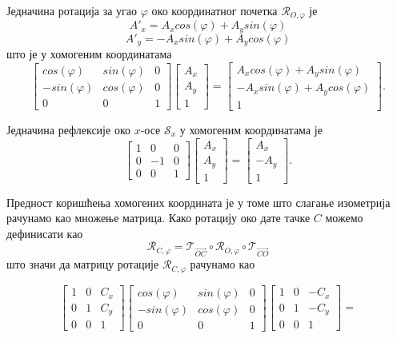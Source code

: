 \documentclass[12pt]{report}
\begin{document}
Једначина ротација за угао $\varphi$ око координатног почетка $\mathcal{R}_{O,\varphi}$ је $$A'_x = A_x  cos(\varphi) +  A_y  sin(\varphi)$$ 
$$A'_y = -A_x  sin(\varphi) + A_y  cos(\varphi)$$
што је у хомогеним координатама
\[\begin{bmatrix}cos(\varphi) & sin(\varphi) & 0\\ -sin(\varphi) & cos(\varphi)&0 \\ 0 & 0 & 1\end{bmatrix} \begin{bmatrix}A_x\\ A_y\\1\end{bmatrix} = 
\begin{bmatrix}A_x  cos(\varphi) +  A_y  sin(\varphi)\\ -A_x  sin(\varphi) + A_y  cos(\varphi)\\1\end{bmatrix}.\]

Једначина рефлексије око $x$-осе $\mathcal{S}_x$  у хомогеним координатама је
\[\begin{bmatrix}1 & 0 & 0\\ 0 & -1&0 \\ 0 & 0 & 1\end{bmatrix} \begin{bmatrix}A_x\\ A_y\\1\end{bmatrix} = 
\begin{bmatrix}A_x \\ -A_y\\1\end{bmatrix}.\]

Предност  коришћења  хомогених  координата  је  у  томе  што  слагање  изометрија  рачунамо  као множење матрица. Како ротацију око дате тачке $C$ можемо дефинисати као
$$\mathcal{R}_{C,\varphi} = \mathcal{T}_{\vec{OC}} \circ \mathcal{R}_{O,\varphi} \circ \mathcal{T}_{\vec{CO}}$$
што значи да матрицу ротације $\mathcal{R}_{C,\varphi}$ рачунамо као

\[\begin{bmatrix}1 & 0 & C_x\\ 0 & 1&C_y \\ 0 & 0 & 1\end{bmatrix}
\begin{bmatrix}cos(\varphi) & sin(\varphi) & 0\\ -sin(\varphi) & cos(\varphi)&0 \\ 0 & 0 & 1\end{bmatrix}
\begin{bmatrix}1 & 0 & -C_x\\ 0 & 1&-C_y \\ 0 & 0 & 1\end{bmatrix}
=  \]
\end{document}
